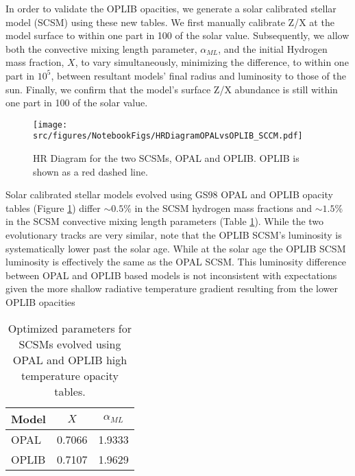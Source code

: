 In order to validate the OPLIB opacities, we generate a solar calibrated
stellar model (SCSM) using these new tables. We first manually calibrate Z/X at
the model surface to within one part in 100 of the solar value. Subsequently,
we allow both the convective mixing length parameter, $\alpha_{ML}$, and the
initial Hydrogen mass fraction, $X$, to vary simultaneously, minimizing the
difference, to within one part in $10^{5}$, between resultant models' final
radius and luminosity to those of the sun. Finally, we confirm that the model's
surface Z/X abundance is still within one part in 100 of the solar value.

\begin{figure}
	\centering
	\texttt{[image: src/figures/NotebookFigs/HRDiagramOPALvsOPLIB\_SCCM.pdf]}
	\caption{HR Diagram for the two SCSMs, OPAL and OPLIB. OPLIB is shown as a red
	dashed line.}
	\label{fig:OPLIBOPALHR}
\end{figure}

Solar calibrated stellar models evolved using GS98 OPAL and OPLIB opacity
tables (Figure \ref{fig:OPLIBOPALHR}) differ $\sim 0.5\%$ in the SCSM hydrogen
mass fractions and $\sim 1.5\%$ in the SCSM convective mixing length parameters
(Table \ref{tab:SCSMResults}). While the two evolutionary tracks are very
similar, note that the OPLIB SCSM's luminosity is systematically lower past the
solar age. While at the solar age the OPLIB SCSM luminosity is effectively the
same as the OPAL SCSM. This luminosity difference between OPAL and OPLIB based
models is not inconsistent with expectations given the more shallow radiative
temperature gradient resulting from the lower OPLIB opacities

\begin{table}
	\centering
	\begin{tabular}{l c c}
		\hline
		Model & $X$ & $\alpha_{ML}$ \\
		\hline
		\hline
		OPAL & 0.7066 & 1.9333 \\
		OPLIB & 0.7107 & 1.9629
	\end{tabular}
	\caption{Optimized parameters for SCSMs evolved using OPAL and OPLIB high
	temperature opacity tables.}
	\label{tab:SCSMResults}
\end{table}

